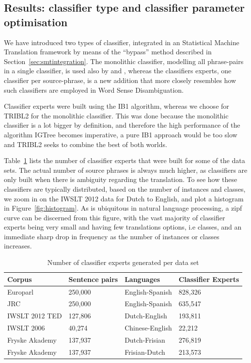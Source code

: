 \documentclass[smallextended]{svjour3}       %
\theoremstyle{break}
\begin{document}
\subsection{Results: classifier type and classifier parameter optimisation}
\label{sec:typeopt}

We have introduced two types of classifier, integrated in an Statistical
Machine Translation framework by means of the ``bypass'' method described in
Section~\ref{sec:smtintegration}. The monolithic classifier, modelling all phrase-pairs
in a single classifier, is used also by \cite{Stroppa+07} and
\cite{Rejwanul+11}, whereas the classifiers experts, one classifier per
source-phrase, is a new addition that more closely resembles how such
classifiers are employed in Word Sense Disambiguation.

Classifier experts were built using the IB1 algorithm, whereas we choose for
TRIBL2 for the monolithic classifier. This was done because the monolithic
classifier is a lot bigger by definition, and therefore the high performance of
the algorithm IGTree becomes imperative, a pure IB1 approach would be too slow
and TRIBL2 seeks to combine the best of both worlds.

Table~\ref{tab:expertcount} lists the number of classifier experts that were
built for some of the data sets. The actual number of source phrases is always
much higher, as classifiers are only built when there is ambiguity regarding
the translation. To see how these classifiers are typically distributed, based
on the number of instances and classes, we zoom in on the IWSLT 2012 data for
Dutch to English, and plot a histogram in Figure~\ref{fig:histogram}. As is
ubiquitous in natural language processing, a zipf curve can be discerned from
this figure, with the vast majority of classifier experts being very small and
having few translations options, i.e classes, and an immediate sharp drop in
frequency as the number of instances or classes increases.

\begin{table}
\begin{tabular}{|lll|l|}
\hline
\textbf{Corpus} & \textbf{Sentence pairs} & \textbf{Languages} & \textbf{Classifier Experts} \\
\hline
Europarl & 250,000 & English-Spanish & 828,326 \\
JRC & 250,000 & English-Spanish & 635,547 \\
IWSLT 2012 TED & 127,806 & Dutch-English & 193,811 \\
IWSLT 2006 & 40,274 & Chinese-English & 22,212 \\
Fryske Akademy & 137,937 & Dutch-Frisian & 276,819 \\
Fryske Akademy & 137,937 & Frisian-Dutch & 213,573 \\
\hline
\end{tabular}
\caption{Number of classifier experts generated per data set}
\label{tab:expertcount}
\end{table}
\end{document}
